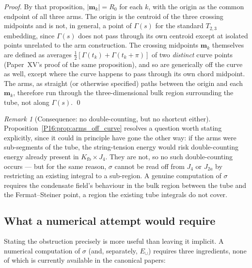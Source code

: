 \documentclass[11pt,a4paper]{article}
\theoremstyle{definition}\newtheorem{definition}[theorem]{Definition}
\theoremstyle{remark}
\newtheorem{remark}[theorem]{Remark}
\theoremstyle{definition}\newtheorem{construction}[theorem]{Construction}
\newcommand{\Kfb}{K_{\mathrm{fb}}}
\begin{document}
\begin{proof}
By that proposition, $|\mathbf{m}_k|=R_0$ for each
$k$, with the origin as the common endpoint of all three arms. The
origin is the centroid of the three crossing midpoints and is not, in
general, a point of $\Gamma(s)$ for the standard $T_{2,3}$ embedding,
since $\Gamma(s)$ does not pass through its own centroid except at
isolated points unrelated to the arm construction. The crossing
midpoints $\mathbf{m}_k$ themselves are defined as averages
$\tfrac12[\Gamma(t_k)+\Gamma(t_k+\pi)]$ of two \emph{distinct} curve
points (Paper~XV's proof of the same proposition), and so
are generically off the curve as well, except where the curve happens
to pass through its own chord midpoint. The arms, as straight (or
otherwise specified) paths between the origin and each $\mathbf{m}_k$,
therefore run through the three-dimensional bulk region surrounding
the tube, not along $\Gamma(s)$.
\qed
\end{proof}

\begin{remark}[Consequence: no double-counting, but no shortcut
  either]
\label{P16:rem:no_doublecounting}
Proposition~\ref{P16:prop:arms_off_curve} resolves a question worth
stating explicitly, since it could in principle have gone the other
way: if the arms were sub-segments of the tube, the string-tension
energy would risk double-counting energy already present in
$\Kfb\times J_4$. They are not, so no such double-counting occurs ---
but for the same reason, $\sigma$ cannot be read off from $J_4$ or
$J_{2a}$ by restricting an existing integral to a sub-region. A
genuine computation of $\sigma$ requires the condensate field's
behaviour in the bulk region between the tube and the Fermat--Steiner
point, a region the existing tube integrals do not cover.
\end{remark}

\subsection{What a numerical attempt would require}
\label{P16:sec:what_is_needed}

Stating the obstruction precisely is more useful than leaving it
implicit. A numerical computation of $\sigma$ (and, separately,
$E_\cup$) requires three ingredients, none of which is currently
available in the canonical papers:
\end{document}
